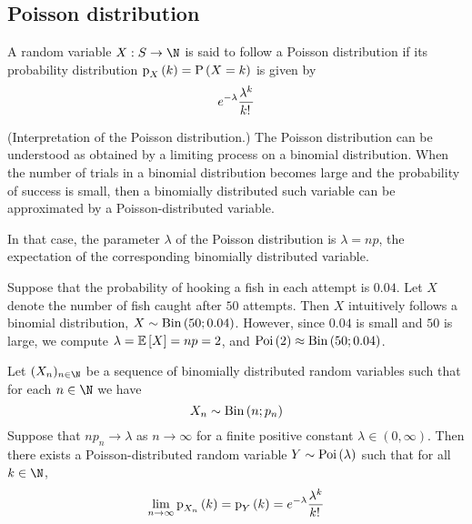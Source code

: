 \documentclass[11pt]{article}
\begin{document}
\subsection{Poisson distribution}

\begin{defn}
    \label{def:poisson-distribution}
    A random variable $X : S \to \N$ is said to follow a Poisson distribution
    if its probability distribution $\p[X]{k} = \P{X = k}$ is given by
    \begin{equation}
        \label{eq:poisson-distribution}
        e^{-\lambda}
        \frac{\lambda^k}{k!\,}
    \end{equation}
\end{defn}

\begin{rem}{(Interpretation of the Poisson distribution.)}
    \label{rem:poisson-interpretation}
    The Poisson distribution can be understood as obtained by a limiting
    process on a binomial distribution. When the number of trials in a binomial
    distribution becomes large and the probability of success is small, then a
    binomially distributed such variable can be approximated by a
    Poisson-distributed variable.

    In that case, the parameter $\lambda$ of the Poisson distribution is
    $\lambda = np$, the expectation of the corresponding binomially distributed
    variable.
\end{rem}

\begin{eg}
    Suppose that the probability of hooking a fish in each attempt is $0.04$.
    Let $X$ denote the number of fish caught after $50$ attempts.
    Then $X$ intuitively follows a binomial distribution,
    $X \sim \operatorname{Bin}\left(50;0.04\right)$.
    However, since $0.04$ is small and $50$ is large, we compute
    $\lambda = \operatorname{\mathbb{E}}{\left[X\right]} = np = 2$, and $\operatorname{Poi}\left(2\right) \approx \operatorname{Bin}\left(50;0.04\right)$.
\end{eg}

\begin{thm}
    \label{thm:poisson}
    Let $(X_n)_{n\in\N}$ be a sequence of binomially distributed random
    variables such that for each $n \in \N$ we have
    \begin{equation*}
        X_n \sim \operatorname{Bin}\left(n;p_n\right)
    \end{equation*}
    Suppose that ${n p_n} \to \lambda$ as $n \to \infty$ for a finite positive
    constant $\lambda \in (0, \infty)$.
    Then there exists a Poisson-distributed random variable
    $Y \sim \operatorname{Poi}\left(\lambda\right)$ such that for all $k \in \N$,
    \begin{equation*}
        \lim_{n\to\infty} { \p[X_n]{k} }
        =
        \p[Y]{k}
        =
        e^{-\lambda}
        \frac{\lambda^k}{k\fact}
    \end{equation*}
\end{thm}
\end{document}
